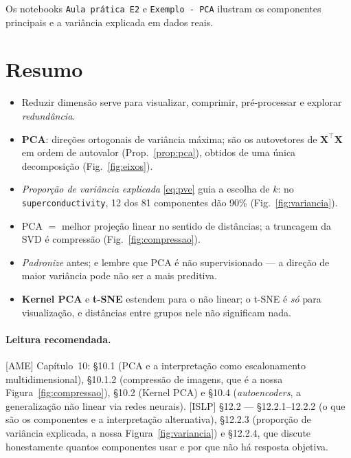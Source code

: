 \documentclass[11pt,a4paper]{article}
\begin{document}
Os notebooks \texttt{Aula prática E2} e \texttt{Exemplo - PCA} ilustram os
componentes principais e a variância
explicada em dados reais.

\section*{Resumo}
\begin{itemize}[leftmargin=1.4cm]
  \item Reduzir dimensão serve para visualizar, comprimir, pré-processar e explorar
        \emph{redundância}.
  \item \textbf{PCA}: direções ortogonais de variância máxima; são os autovetores de
        $\bm{X}^\top\bm{X}$ em ordem de autovalor (Prop.~\ref{prop:pca}), obtidos de
        uma única decomposição (Fig.~\ref{fig:eixos}).
  \item \emph{Proporção de variância explicada} \eqref{eq:pve} guia a escolha de
        $k$: no \texttt{superconductivity}, 12 dos 81 componentes dão 90\%
        (Fig.~\ref{fig:variancia}).
  \item PCA $=$ melhor projeção linear no sentido de distâncias; a truncagem da SVD
        é compressão (Fig.~\ref{fig:compressao}).
  \item \emph{Padronize} antes; e lembre que PCA é não supervisionado --- a direção
        de maior variância pode não ser a mais preditiva.
  \item \textbf{Kernel PCA} e \textbf{t-SNE} estendem para o não linear; o t-SNE é
        \emph{só} para visualização, e distâncias entre grupos nele não significam
        nada.
\end{itemize}

\paragraph{Leitura recomendada.} [AME] Capítulo~10: §10.1 (PCA e a interpretação
como escalonamento multidimensional), §10.1.2 (compressão de imagens, que é a nossa
Figura~\ref{fig:compressao}), §10.2 (Kernel PCA) e §10.4 (\emph{autoencoders}, a
generalização não linear via redes neurais). [ISLP] §12.2 --- §12.2.1--12.2.2 (o que
são os componentes e a interpretação alternativa), §12.2.3 (proporção de variância
explicada, a nossa Figura~\ref{fig:variancia}) e §12.2.4, que discute honestamente
quantos componentes usar e por que não há resposta objetiva.
\end{document}
